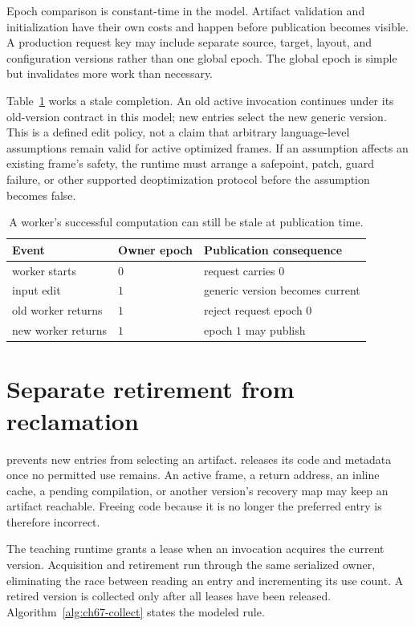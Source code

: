 Epoch comparison is constant-time in the model.
Artifact validation and initialization have their own costs and happen before publication becomes visible.
A production request key may include separate source, target, layout, and configuration versions rather than one global epoch.
The global epoch is simple but invalidates more work than necessary.

Table~\ref{tab:ch67-epoch} works a stale completion.
An old active invocation continues under its old-version contract in this model; new entries select the new generic version.
This is a defined edit policy, not a claim that arbitrary language-level assumptions remain valid for active optimized frames.
If an assumption affects an existing frame's safety, the runtime must arrange a safepoint, patch, guard failure, or other supported deoptimization protocol before the assumption becomes false.

\begin{table}[htbp]
\caption{A worker's successful computation can still be stale at publication time.}
\label{tab:ch67-epoch}
\centering
\begin{tabular}{lll}
\toprule
Event & Owner epoch & Publication consequence \\
\midrule
worker starts & $0$ & request carries $0$ \\
input edit & $1$ & generic version becomes current \\
old worker returns & $1$ & reject request epoch $0$ \\
new worker returns & $1$ & epoch $1$ may publish \\
\bottomrule
\end{tabular}
\end{table}

\section{Separate retirement from reclamation}
\label{sec:ch67-reclamation}

 prevents new entries from selecting an artifact.
 releases its code and metadata once no permitted use remains.
An active frame, a return address, an inline cache, a pending compilation, or another version's recovery map may keep an artifact reachable.
Freeing code because it is no longer the preferred entry is therefore incorrect.

The teaching runtime grants a lease when an invocation acquires the current version.
Acquisition and retirement run through the same serialized owner, eliminating the race between reading an entry and incrementing its use count.
A retired version is collected only after all leases have been released.
Algorithm~\ref{alg:ch67-collect} states the modeled rule.

